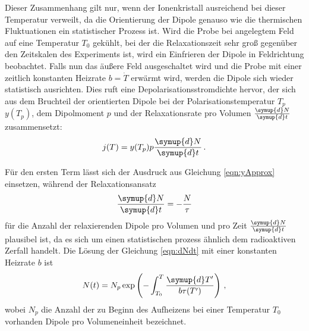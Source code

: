 Dieser Zusammenhang gilt nur, wenn der Ionenkristall ausreichend bei dieser Temperatur verweilt, da die Orientierung der Dipole genauso wie die thermischen Fluktuationen ein statistischer Prozess ist. Wird die Probe bei angelegtem Feld auf eine Temperatur  $T_0$ gekühlt, bei der die Relaxationszeit sehr groß gegenüber den Zeitskalen des Experiments ist, wird ein Einfrieren der Dipole in Feldrichtung beobachtet. Falls nun das äußere Feld ausgeschaltet wird und die Probe mit einer zeitlich konstanten Heizrate $b=\dot{T}$ erwärmt wird, werden die Dipole sich wieder statistisch ausrichten. Dies ruft eine Depolarisationsstromdichte hervor, der sich aus dem Bruchteil der orientierten Dipole bei der Polarisationstemperatur $T_p$ $y(T_p)$, dem Dipolmoment $p$ und der Relaxationsrate pro Volumen $\frac{\symup{d}N}{\symup{d}t}$ zusammensetzt:
\begin{equation}
  j(T) = y(T_p) p \frac{\symup{d}N}{\symup{d}t}\,.
  \label{eqn:jAnsatz}
\end{equation}

Für den ersten Term lässt sich der Ausdruck aus Gleichung \eqref{eqn:yApprox} einsetzen, während der Relaxationsansatz
\begin{equation}
  \frac{\symup{d}N}{\symup{d}t} = - \frac{N}{\tau}
  \label{eqn:dNdt}
\end{equation}
für die Anzahl der relaxierenden Dipole pro Volumen und pro Zeit $\frac{\symup{d}N}{\symup{d}t}$ plausibel ist, da es sich um einen statistischen prozess ähnlich dem radioaktiven Zerfall handelt.
Die Lösung der Gleichung \eqref{eqn:dNdt} mit einer konstanten Heizrate $b$ ist
\begin{equation}
  N(t) = N_p \exp \left(- \int_{T_0}^{T} \frac{\symup{d}T'}{b \tau(T')} \right) \,,
  \label{eqn:N(t)}
\end{equation}
wobei $N_p$ die Anzahl der zu Beginn des Aufheizens bei einer Temperatur $T_0$ vorhanden Dipole pro Volumeneinheit bezeichnet.

